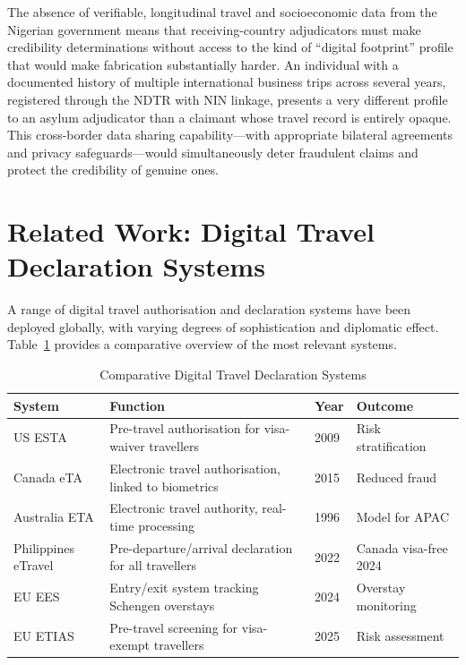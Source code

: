 \documentclass[11pt]{article}
\begin{document}
The absence of verifiable, longitudinal travel and socioeconomic data
from the Nigerian government means that receiving-country adjudicators
must make credibility determinations without access to the kind of
``digital footprint'' profile that would make fabrication substantially
harder. An individual with a documented history of multiple international
business trips across several years, registered through the NDTR with NIN
linkage, presents a very different profile to an asylum adjudicator
than a claimant whose travel record is entirely opaque.
This cross-border data sharing capability---with appropriate bilateral
agreements and privacy safeguards---would simultaneously deter
fraudulent claims and protect the credibility of genuine ones.

\section{Related Work: Digital Travel Declaration Systems}
\label{sec:related}

A range of digital travel authorisation and declaration systems have
been deployed globally, with varying degrees of sophistication and
diplomatic effect. Table~\ref{tab:systems} provides a comparative
overview of the most relevant systems.

\begin{table}[ht]
\caption{Comparative Digital Travel Declaration Systems}
\label{tab:systems}
\small
\begin{tabularx}{\columnwidth}{@{}lXll@{}}
\toprule
\textbf{System} & \textbf{Function} & \textbf{Year} & \textbf{Outcome} \\
\midrule
US ESTA         & Pre-travel authorisation for visa-waiver travellers & 2009 & Risk stratification \\
Canada eTA      & Electronic travel authorisation, linked to biometrics & 2015 & Reduced fraud \\
Australia ETA   & Electronic travel authority, real-time processing & 1996 & Model for APAC \\
Philippines eTravel & Pre-departure/arrival declaration for all travellers & 2022 & Canada visa-free 2024 \\
EU EES          & Entry/exit system tracking Schengen overstays & 2024 & Overstay monitoring \\
EU ETIAS        & Pre-travel screening for visa-exempt travellers & 2025 & Risk assessment \\
\bottomrule
\end{tabularx}
\end{table}
\end{document}
